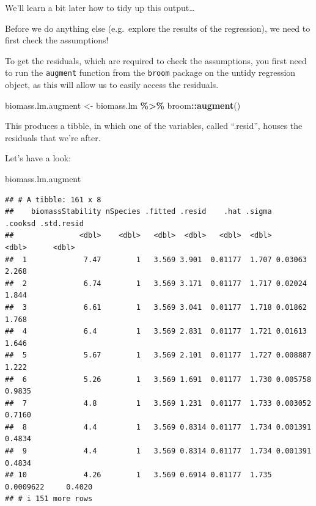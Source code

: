 \documentclass[
]{book}
\newenvironment{Shaded}{\begin{snugshade}}{\end{snugshade}}
\newcommand{\FunctionTok}[1]{\textcolor[rgb]{0.13,0.29,0.53}{\textbf{#1}}}
\newcommand{\NormalTok}[1]{#1}
\newcommand{\OtherTok}[1]{\textcolor[rgb]{0.56,0.35,0.01}{#1}}
\newcommand{\SpecialCharTok}[1]{\textcolor[rgb]{0.81,0.36,0.00}{\textbf{#1}}}
\begin{document}
We'll learn a bit later how to tidy up this output\ldots{}

Before we do anything else (e.g.~explore the results of the regression), we need to first check the assumptions!

To get the residuals, which are required to check the assumptions, you first need to run the \texttt{augment} function from the \texttt{broom} package on the untidy regression object, as this will allow us to easily access the residuals.

\begin{Shaded}
\begin{Highlighting}[]
\NormalTok{biomass.lm.augment }\OtherTok{\textless{}{-}}\NormalTok{ biomass.lm }\SpecialCharTok{\%\textgreater{}\%}
\NormalTok{  broom}\SpecialCharTok{::}\FunctionTok{augment}\NormalTok{()}
\end{Highlighting}
\end{Shaded}

This produces a tibble, in which one of the variables, called ``.resid'', houses the residuals that we're after.

Let's have a look:

\begin{Shaded}
\begin{Highlighting}[]
\NormalTok{biomass.lm.augment}
\end{Highlighting}
\end{Shaded}

\begin{verbatim}
## # A tibble: 161 x 8
##    biomassStability nSpecies .fitted .resid    .hat .sigma   .cooksd .std.resid
##               <dbl>    <dbl>   <dbl>  <dbl>   <dbl>  <dbl>     <dbl>      <dbl>
##  1             7.47        1   3.569 3.901  0.01177  1.707 0.03063       2.268 
##  2             6.74        1   3.569 3.171  0.01177  1.717 0.02024       1.844 
##  3             6.61        1   3.569 3.041  0.01177  1.718 0.01862       1.768 
##  4             6.4         1   3.569 2.831  0.01177  1.721 0.01613       1.646 
##  5             5.67        1   3.569 2.101  0.01177  1.727 0.008887      1.222 
##  6             5.26        1   3.569 1.691  0.01177  1.730 0.005758      0.9835
##  7             4.8         1   3.569 1.231  0.01177  1.733 0.003052      0.7160
##  8             4.4         1   3.569 0.8314 0.01177  1.734 0.001391      0.4834
##  9             4.4         1   3.569 0.8314 0.01177  1.734 0.001391      0.4834
## 10             4.26        1   3.569 0.6914 0.01177  1.735 0.0009622     0.4020
## # i 151 more rows
\end{verbatim}
\end{document}
